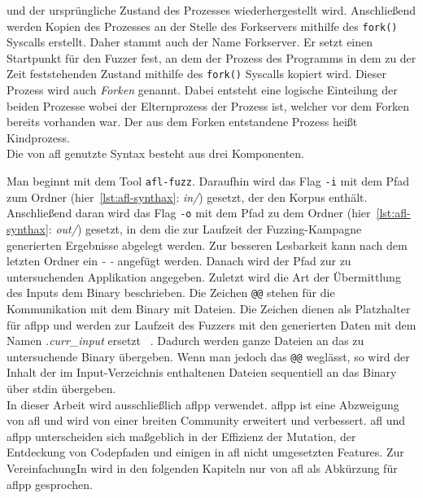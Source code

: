und der ursprüngliche Zustand des Prozesses wiederhergestellt wird.
Anschließend werden Kopien des Prozesses an der Stelle des Forkservers mithilfe des \texttt{fork()} Syscalls erstellt.
Daher stammt auch der Name Forkserver.
Er setzt einen Startpunkt für den Fuzzer fest, an dem der Prozess des Programms in dem zu der Zeit feststehenden Zustand
mithilfe des \texttt{fork()} Syscalls kopiert wird.
Dieser Prozess wird auch \textit{Forken} genannt.
Dabei entsteht eine logische Einteilung der beiden Prozesse wobei der Elternprozess der Prozess ist, welcher vor dem Forken
bereits vorhanden war.
Der aus dem Forken entstandene Prozess heißt Kindprozess.\\
\linebreak
Die von \gls{afl} genutzte Syntax besteht aus drei Komponenten.

Man beginnt mit dem Tool \texttt{afl-fuzz}.
Daraufhin wird das Flag \texttt{-i} mit dem Pfad zum Ordner (hier~\ref{lst:afl-synthax}: \textit{in/}) gesetzt, der den Korpus enthält.
Anschließend daran wird das Flag \texttt{-o} mit dem Pfad zu dem Ordner (hier~\ref{lst:afl-synthax}: \textit{out/}) gesetzt,
in dem die zur Laufzeit der Fuzzing-Kampagne generierten Ergebnisse abgelegt werden.
Zur besseren Lesbarkeit kann nach dem letzten Ordner ein \textit{- -} angefügt werden.
Danach wird der Pfad zur zu untersuchenden Applikation angegeben.
Zuletzt wird die Art der Übermittlung des Inputs dem Binary beschrieben.
Die Zeichen \texttt{@@} stehen für die Kommunikation mit dem Binary mit Dateien.
Die Zeichen dienen als Platzhalter für \gls{aflpp} und werden zur Laufzeit des Fuzzers mit den generierten Daten mit dem
Namen \textit{.curr\_input} ersetzt ~\cite{afl-file-extension}.
Dadurch werden ganze Dateien an das zu untersuchende Binary übergeben.
Wenn man jedoch das \texttt{@@} weglässt, so wird der Inhalt der im Input-Verzeichnis enthaltenen Dateien sequentiell an
das Binary über stdin übergeben. \\
\linebreak
In dieser Arbeit wird ausschließlich \gls{aflpp} verwendet.
\gls{aflpp} ist eine Abzweigung von \gls{afl} und wird von einer breiten Community erweitert und verbessert.
\gls{afl} und \gls{aflpp} unterscheiden sich maßgeblich in der Effizienz der Mutation, der Entdeckung von Codepfaden und
einigen in \gls{afl} nicht umgesetzten Features.
Zur VereinfachungIn wird in den folgenden Kapiteln nur von \gls{afl} als Abkürzung für \gls{aflpp} gesprochen.